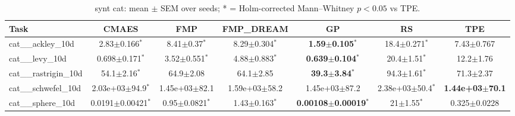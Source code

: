 \begin{table}[t]
\caption{synt cat: mean $\pm$ SEM over seeds; * = Holm-corrected Mann--Whitney $p<0.05$ vs TPE.}
\label{tab:synt_cat}
\begin{center}\small
\begin{tabular}{lcccccc}
\hline
Task & CMAES & FMP & FMP\_DREAM & GP & RS & TPE \\
\hline
cat\_\_ackley\_10d & 2.83$\pm$0.166$^{*}$ & 8.41$\pm$0.37$^{*}$ & 8.29$\pm$0.304$^{*}$ & \textbf{1.59$\pm$0.105}$^{*}$ & 18.4$\pm$0.271$^{*}$ & 7.43$\pm$0.767 \\
cat\_\_levy\_10d & 0.698$\pm$0.171$^{*}$ & 3.52$\pm$0.551$^{*}$ & 4.88$\pm$0.883$^{*}$ & \textbf{0.639$\pm$0.104}$^{*}$ & 20.4$\pm$1.51$^{*}$ & 12.2$\pm$1.76 \\
cat\_\_rastrigin\_10d & 54.1$\pm$2.16$^{*}$ & 64.9$\pm$2.08 & 64.1$\pm$2.85 & \textbf{39.3$\pm$3.84}$^{*}$ & 94.3$\pm$1.61$^{*}$ & 71.3$\pm$2.37 \\
cat\_\_schwefel\_10d & 2.03e+03$\pm$94.9$^{*}$ & 1.45e+03$\pm$82.1 & 1.59e+03$\pm$58.2 & 1.45e+03$\pm$87.2 & 2.38e+03$\pm$50.4$^{*}$ & \textbf{1.44e+03$\pm$70.1} \\
cat\_\_sphere\_10d & 0.0191$\pm$0.00421$^{*}$ & 0.95$\pm$0.0821$^{*}$ & 1.43$\pm$0.163$^{*}$ & \textbf{0.00108$\pm$0.00019}$^{*}$ & 21$\pm$1.55$^{*}$ & 0.325$\pm$0.0228 \\
\hline
\end{tabular}
\end{center}
\end{table}